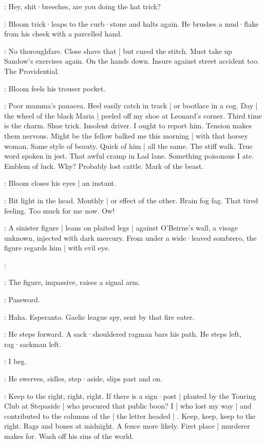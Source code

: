 \Motorman:
Hey,
shit·breeches,
are you doing the hat trick?

:
Bloom trick·leaps to the curb·stone and halts again.
He brushes a mud·flake from his cheek with a parcelled hand.

\Bloom:
No thoroughfare.
Close shave that |
but cured the stitch.
Must take up Sandow's exercises again.
On the hands down.
Insure against street accident too.
The Providential.

:
Bloom feels his trouser pocket.

\Bloom:
Poor mamma's panacea.
Heel easily catch in track |
or bootlace in a cog.
Day |
the wheel of the black Maria |
peeled off my shoe at Leonard's corner.
Third time is the charm.
Shoe trick.
Insolent driver.
I ought to report him.
Tension makes them nervous.
Might be the fellow balked me this morning |
with that horsey woman.
Same style of beauty.
Quick of him |
all the same.
The stiff walk.
True word spoken in jest.
That awful cramp in Lad lane.
Something poisonous I ate.
Emblem of luck.
Why?
Probably lost cattle.
Mark of the beast.

:
Bloom closes his eyes |
an instant.

\Bloom:
Bit light in the head.
Monthly |
or effect of the other.
Brain fog fag.
That tired feeling.
Too much for me now.
Ow!

:
A sinister figure |
leans on plaited legs |
against O'Beirne's wall,
a visage unknown,
injected with dark mercury.
From under a wide·leaved sombrero,
the figure regards him |
with evil eye.

\Bloom:

:
The figure,
impassive,
raises a signal arm.

\Figure:
Password.

\Bloom:
Haha.
Esperanto.
Gaelic league spy,
sent by that fire eater.

:
He steps forward.
A sack·shouldered ragman bars his path.
He steps left,
rag·sackman left.

\Bloom:
I beg.

:
He swerves,
sidles,
step·aside,
slips past and on.

\Bloom:
Keep to the right,
right,
right.
If there is a sign·post |
planted by the Touring Club at Stepaside |
who procured that public boon?
I |
who lost my way |
and contributed to the columns of the  |
the letter headed |
.
Keep,
keep,
keep to the right.
Rags and bones at midnight.
A fence more likely.
First place |
murderer makes for.
Wash off his sins of the world.

